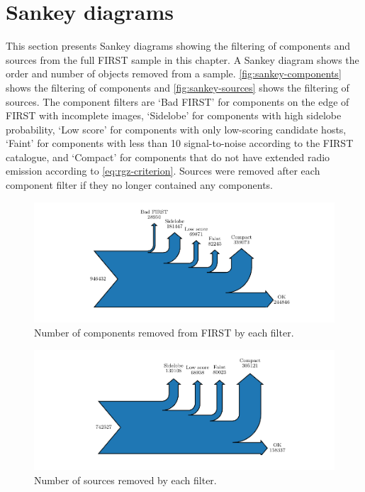 \appendix

  \section{Sankey diagrams}
  \label{sec:rlfs-sankey}

    This section presents Sankey diagrams showing the filtering of components and sources from the full FIRST sample in this chapter. A Sankey diagram shows the order and number of objects removed from a sample. \autoref{fig:sankey-components} shows the filtering of components and \autoref{fig:sankey-sources} shows the filtering of sources. The component filters are `Bad FIRST' for components on the edge of FIRST with incomplete images, `Sidelobe' for components with high sidelobe probability, `Low score' for components with only low-scoring candidate hosts, `Faint' for components with less than 10 signal-to-noise according to the FIRST catalogue, and `Compact' for components that do not have extended radio emission according to \autoref{eq:rgz-criterion}. Sources were removed after each component filter if they no longer contained any components.

    \begin{figure}
        \centering
        \includegraphics{rlf-images/sankey_components.pdf}
        \caption{\label{fig:sankey-components} Number of components removed from FIRST by each filter.}
    \end{figure}

    \begin{figure}
        \centering
        \includegraphics{rlf-images/sankey_sources.pdf}
        \caption{\label{fig:sankey-sources} Number of sources removed by each filter.}
    \end{figure}

